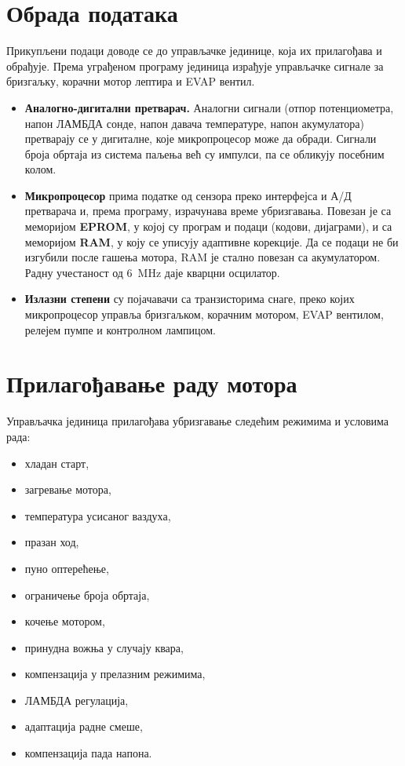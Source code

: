 \documentclass[12pt]{article}
\begin{document}
\section{Обрада података}

\begin{kljucno}
      Прикупљени подаци доводе се до управљачке јединице, која их прилагођава и
обрађује. Према уграђеном програму јединица израђује управљачке сигнале за
бризгаљку, корачни мотор лептира и EVAP вентил.
\end{kljucno}

\begin{kljucno}
      \begin{itemize}
    \item \textbf{Аналогно-дигитални претварач.} Аналогни сигнали (отпор
          потенциометра, напон ЛАМБДА сонде, напон давача температуре, напон
          акумулатора) претварају се у дигиталне, које микропроцесор може да
          обради. Сигнали броја обртаја из система паљења већ су импулси, па
          се обликују посебним колом.
    \item \textbf{Микропроцесор} прима податке од сензора преко интерфејса и
          А/Д претварача и, према програму, израчунава време убризгавања.
          Повезан је са меморијом \textbf{EPROM}, у којој су програм и
          подаци (кодови, дијаграми), и са меморијом \textbf{RAM}, у коју се
          уписују адаптивне корекције. Да се подаци не би изгубили после
          гашења мотора, RAM је стално повезан са акумулатором. Радну
          учестаност од 6~MHz даје кварцни осцилатор.
    \item \textbf{Излазни степени} су појачавачи са транзисторима снаге, преко
          којих микропроцесор управља бризгаљком, корачним мотором, EVAP
          вентилом, релејем пумпе и контролном лампицом.
\end{itemize}
\end{kljucno}

\section{Прилагођавање раду мотора}

Управљачка јединица прилагођава убризгавање следећим режимима и условима рада:
\begin{itemize}[noitemsep]
    \item хладан старт,
    \item загревање мотора,
    \item температура усисаног ваздуха,
    \item празан ход,
    \item пуно оптерећење,
    \item ограничење броја обртаја,
    \item кочење мотором,
    \item принудна вожња у случају квара,
    \item компензација у прелазним режимима,
    \item ЛАМБДА регулација,
    \item адаптација радне смеше,
    \item компензација пада напона.
\end{itemize}
\end{document}
